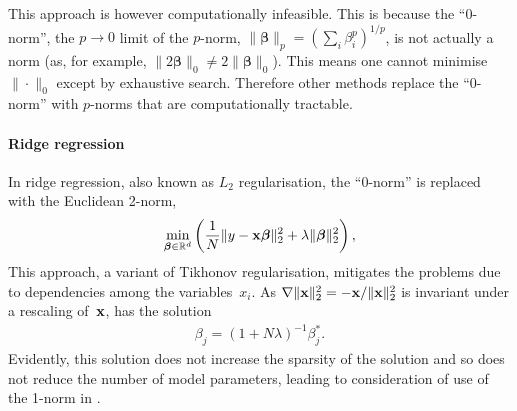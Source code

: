 This approach is however computationally infeasible. 
This is because the ``0-norm'', the $p\to0$ limit of the $p$-norm, $\|\boldsymbol{\beta}\|_p=\left(\sum_i \beta_i^p\right)^{1/p}$,
is not actually a norm (as, for example, $\|2\boldsymbol{\beta}\|_0\neq 2\|\boldsymbol{\beta}\|_0$).
This means one cannot minimise $\|\cdot\|_0$ except by exhaustive search.
Therefore other methods replace the ``0-norm'' with $p$-norms that are computationally tractable.


\paragraph{Ridge regression} 
In ridge regression, also known as $L_2$ regularisation, the ``0-norm'' is replaced with the Euclidean 2-norm,
\begin{align}
	\label{eq:ridge_regression}
	\min_{\boldsymbol{\beta}\in \mathbb{R}^d}\left( \frac{1}{N}\|y - \mathbf{x}\boldsymbol{\beta}\|^2_2 + \lambda \|\boldsymbol{\beta}\|_2^2 \right),
\end{align}
This approach, a variant of Tikhonov regularisation, mitigates the problems due to dependencies
among the variables~$x_i$.
As $\nabla\|\mathbf{x}\|^2_2= -\mathbf{x}/\|\mathbf{x}\|^2_2$ is invariant under a rescaling of~$\mathbf{x}$, 
 has the solution
\begin{align}
	\label{eq:ridge_regression_solution}
	\beta_j 
	= (1+N\lambda)^{-1} \beta^*_j.
\end{align}
%
Evidently, this solution %
does not increase the sparsity of the solution
and so does not reduce the number of model parameters, leading to consideration
of use of the 1-norm in . %

